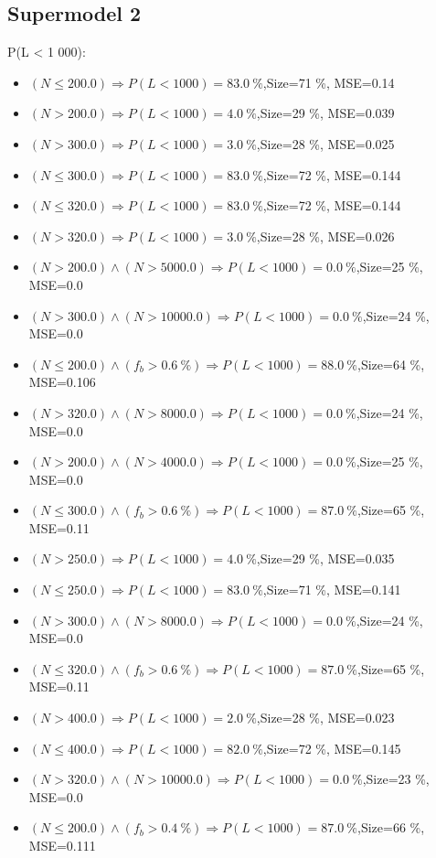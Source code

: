 \documentclass[numbered]{CSL}
\begin{document}
\subsection{Supermodel 2}
P(L < 1 000):
\begin{itemize}
\item $(N \leq 200.0) \Rightarrow P(L < 1 000) = 83.0~\%$,\hfill Size=71 \%, MSE=0.14
\item $(N > 200.0) \Rightarrow P(L < 1 000) = 4.0~\%$,\hfill Size=29 \%, MSE=0.039
\item $(N > 300.0) \Rightarrow P(L < 1 000) = 3.0~\%$,\hfill Size=28 \%, MSE=0.025
\item $(N \leq 300.0) \Rightarrow P(L < 1 000) = 83.0~\%$,\hfill Size=72 \%, MSE=0.144
\item $(N \leq 320.0) \Rightarrow P(L < 1 000) = 83.0~\%$,\hfill Size=72 \%, MSE=0.144
\item $(N > 320.0) \Rightarrow P(L < 1 000) = 3.0~\%$,\hfill Size=28 \%, MSE=0.026
\item $(N > 200.0) \land (N > 5000.0) \Rightarrow P(L < 1 000) = 0.0~\%$,\hfill Size=25 \%, MSE=0.0
\item $(N > 300.0) \land (N > 10000.0) \Rightarrow P(L < 1 000) = 0.0~\%$,\hfill Size=24 \%, MSE=0.0
\item $(N \leq 200.0) \land (f_b > 0.6~\%) \Rightarrow P(L < 1 000) = 88.0~\%$,\hfill Size=64 \%, MSE=0.106
\item $(N > 320.0) \land (N > 8000.0) \Rightarrow P(L < 1 000) = 0.0~\%$,\hfill Size=24 \%, MSE=0.0
\item $(N > 200.0) \land (N > 4000.0) \Rightarrow P(L < 1 000) = 0.0~\%$,\hfill Size=25 \%, MSE=0.0
\item $(N \leq 300.0) \land (f_b > 0.6~\%) \Rightarrow P(L < 1 000) = 87.0~\%$,\hfill Size=65 \%, MSE=0.11
\item $(N > 250.0) \Rightarrow P(L < 1 000) = 4.0~\%$,\hfill Size=29 \%, MSE=0.035
\item $(N \leq 250.0) \Rightarrow P(L < 1 000) = 83.0~\%$,\hfill Size=71 \%, MSE=0.141
\item $(N > 300.0) \land (N > 8000.0) \Rightarrow P(L < 1 000) = 0.0~\%$,\hfill Size=24 \%, MSE=0.0
\item $(N \leq 320.0) \land (f_b > 0.6~\%) \Rightarrow P(L < 1 000) = 87.0~\%$,\hfill Size=65 \%, MSE=0.11
\item $(N > 400.0) \Rightarrow P(L < 1 000) = 2.0~\%$,\hfill Size=28 \%, MSE=0.023
\item $(N \leq 400.0) \Rightarrow P(L < 1 000) = 82.0~\%$,\hfill Size=72 \%, MSE=0.145
\item $(N > 320.0) \land (N > 10000.0) \Rightarrow P(L < 1 000) = 0.0~\%$,\hfill Size=23 \%, MSE=0.0
\item $(N \leq 200.0) \land (f_b > 0.4~\%) \Rightarrow P(L < 1 000) = 87.0~\%$,\hfill Size=66 \%, MSE=0.111
\end{itemize}
\end{document}
